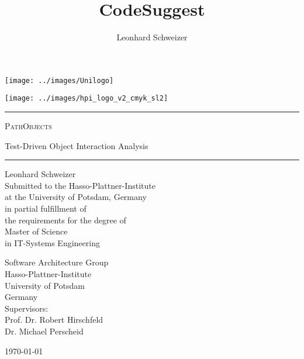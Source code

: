 \title{CodeSuggest}
\author{Leonhard Schweizer}
\begin{titlepage}
\pagestyle{empty}

\noindent
\begin{minipage}[b]{0.4\linewidth}
\noindent
\texttt{[image: ../images/Unilogo]}
\end{minipage}
\hfill
\begin{minipage}[b]{0.4\linewidth}
\hfill
\vspace{3mm}
\texttt{[image: ../images/hpi\_logo\_v2\_cmyk\_sl2]}
\end{minipage}

\vspace{2cm}

\begin{center}
\begin{minipage}{0.7\textwidth}
\begin{center}
\begin{large}
\hrule
\vspace{2em}
\textsc{\Huge \textsc{PathObjects} \\[0.5em]}
\begin{doublespace}
  {\LARGE Test-Driven Object Interaction Analysis}
  \\[1.2em]
\end{doublespace}
\hrule
\vspace{1.5cm}

{\huge Leonhard Schweizer } \\[1.5cm]

Submitted to the Hasso-Plattner-Institute \\
at the University of Potsdam, Germany \\
in partial fulfillment of \\
the requirements for the degree of \\[5mm]
{\Large Master of Science} \\[1mm]
in IT-Systems Engineering \\[2cm]

\begin{multicols}{2}
Software Architecture Group\\
Hasso-Plattner-Institute\\
University of Potsdam \\
Germany \\
Supervisors: \\
Prof. Dr. Robert Hirschfeld \\
Dr. Michael Perscheid \\
\end{multicols}
\end{large}
\end{center}
\end{minipage}
\vfill
{\LARGE \today \\ ~ }
\end{center}
\end{titlepage}
\restoregeometry
\cleardoublepage